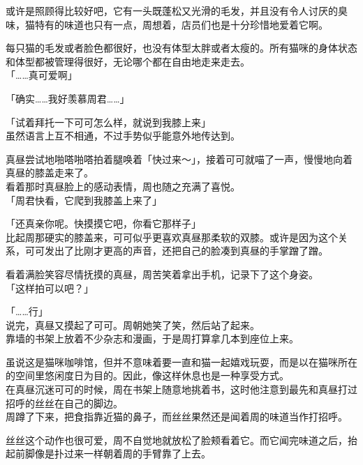 或许是照顾得比较好吧，它有一头既蓬松又光滑的毛发，并且没有令人讨厌的臭味，猫特有的味道也只有一点，周想着，店员们也是十分珍惜地爱着它啊。

每只猫的毛发或者脸色都很好，也没有体型太胖或者太瘦的。所有猫咪的身体状态和体型都被管理得很好，无论哪个都在自由地走来走去。\\

「……真可爱啊」

「确实……我好羡慕周君……」

「试着拜托一下可可怎么样，就说到我膝上来」\\

虽然语言上互不相通，不过手势似乎能意外地传达到。

真昼尝试地啪嗒啪嗒拍着腿唤着「快过来～」，接着可可就喵了一声，慢慢地向着真昼的膝盖走来了。\\

看着那时真昼脸上的感动表情，周也随之充满了喜悦。\\

「周君快看，它爬到我膝盖上来了」

「还真亲你呢。快摸摸它吧，你看它那样子」\\

比起周那硬实的膝盖来，可可似乎更喜欢真昼那柔软的双膝。或许是因为这个关系，可可发出了比刚才更高的声音，还把自己的脸凑到真昼的手掌蹭了蹭。

看着满脸笑容尽情抚摸的真昼，周苦笑着拿出手机，记录下了这个身姿。\\

「这样拍可以吧？」

「……行」\\

说完，真昼又摸起了可可。周朝她笑了笑，然后站了起来。\\

靠墙的书架上放着不少杂志和漫画，于是周打算拿几本到座位上来。

虽说这是猫咪咖啡馆，但并不意味着要一直和猫一起嬉戏玩耍，而是以在猫咪所在的空间里悠闲度日为目的。因此，像这样休息也是一种享受方式。\\

在真昼沉迷可可的时候，周在书架上随意地挑着书，这时他注意到最先和真昼打过招呼的丝丝在自己的脚边。\\

周蹲了下来，把食指靠近猫的鼻子，而丝丝果然还是闻着周的味道当作打招呼。

丝丝这个动作也很可爱，周不自觉地就放松了脸颊看着它。而它闻完味道之后，抬起前脚像是扑过来一样朝着周的手臂靠了上去。\\


